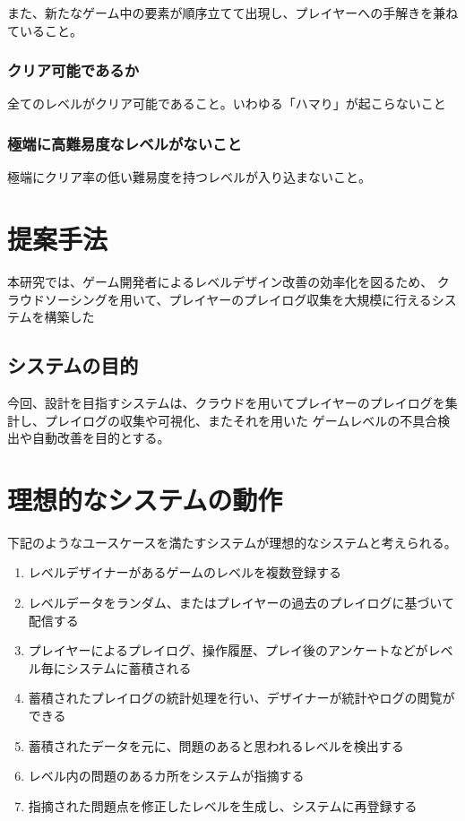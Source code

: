 また、新たなゲーム中の要素が順序立てて出現し、プレイヤーへの手解きを兼ねていること。

\subsubsection{クリア可能であるか}
全てのレベルがクリア可能であること。いわゆる「ハマり」が起こらないこと

\subsubsection{極端に高難易度なレベルがないこと}
極端にクリア率の低い難易度を持つレベルが入り込まないこと。


\section{提案手法}
本研究では、ゲーム開発者によるレベルデザイン改善の効率化を図るため、
クラウドソーシングを用いて、プレイヤーのプレイログ収集を大規模に行えるシステムを構築した

\subsection{システムの目的}
今回、設計を目指すシステムは、クラウドを用いてプレイヤーのプレイログを集計し、プレイログの収集や可視化、またそれを用いた
ゲームレベルの不具合検出や自動改善を目的とする。

\section{理想的なシステムの動作}
下記のようなユースケースを満たすシステムが理想的なシステムと考えられる。

\begin{enumerate}
  \item レベルデザイナーがあるゲームのレベルを複数登録する
  \item レベルデータをランダム、またはプレイヤーの過去のプレイログに基づいて配信する
  \item プレイヤーによるプレイログ、操作履歴、プレイ後のアンケートなどがレベル毎にシステムに蓄積される
  \item 蓄積されたプレイログの統計処理を行い、デザイナーが統計やログの閲覧ができる
  \item 蓄積されたデータを元に、問題のあると思われるレベルを検出する
  \item レベル内の問題のあるカ所をシステムが指摘する
  \item 指摘された問題点を修正したレベルを生成し、システムに再登録する
\end{enumerate}

